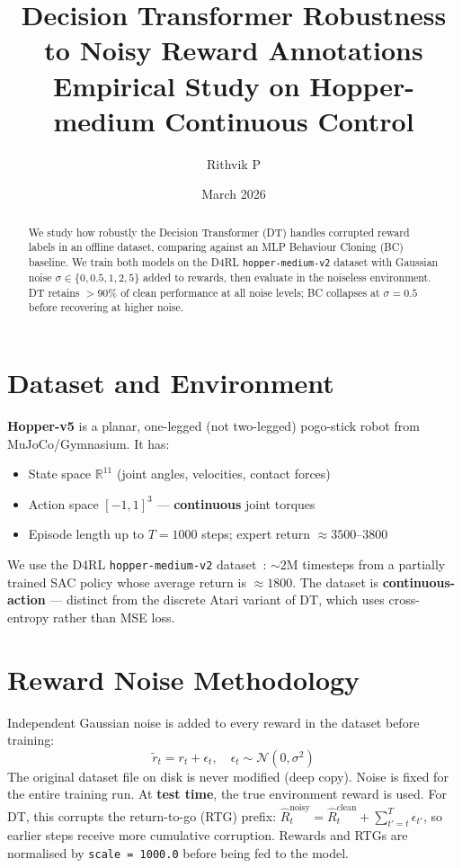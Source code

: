 \documentclass[10pt,a4paper,twocolumn]{article}
\title{\textbf{Decision Transformer Robustness to Noisy Reward Annotations}\\[2pt]
       \normalsize Empirical Study on Hopper-medium Continuous Control}
\author{Rithvik P}
\date{March 2026}
\begin{document}
\maketitle

\begin{abstract}
We study how robustly the Decision Transformer (DT) handles corrupted reward
labels in an offline dataset, comparing against an MLP Behaviour Cloning (BC)
baseline. We train both models on the D4RL \texttt{hopper-medium-v2} dataset with
Gaussian noise $\sigma \in \{0, 0.5, 1, 2, 5\}$ added to rewards, then evaluate
in the noiseless environment. DT retains $>$90\% of clean performance at all noise
levels; BC collapses at $\sigma=0.5$ before recovering at higher noise.
\end{abstract}

\section{Dataset and Environment}

\textbf{Hopper-v5} is a planar, one-legged (not two-legged) pogo-stick robot
from MuJoCo/Gymnasium. It has:
\begin{itemize}[noitemsep,topsep=2pt]
  \item State space $\mathbb{R}^{11}$ (joint angles, velocities, contact forces)
  \item Action space $[-1,1]^3$ — \textbf{continuous} joint torques
  \item Episode length up to $T=1000$ steps; expert return $\approx3500$--$3800$
\end{itemize}

We use the D4RL \texttt{hopper-medium-v2} dataset~\cite{fu2020d4rl}: $\sim$2M
timesteps from a partially trained SAC policy whose average return is $\approx1800$.
The dataset is \textbf{continuous-action} — distinct from the discrete Atari variant
of DT, which uses cross-entropy rather than MSE loss.

\section{Reward Noise Methodology}

Independent Gaussian noise is added to every reward in the dataset before training:
\[
  \tilde{r}_t = r_t + \epsilon_t,\quad \epsilon_t \sim \mathcal{N}(0,\sigma^2)
\]
The original dataset file on disk is never modified (deep copy). Noise is fixed for
the entire training run. At \textbf{test time}, the true environment reward is used.
For DT, this corrupts the return-to-go (RTG) prefix:
$\hat{R}_t^{\text{noisy}} = \hat{R}_t^{\text{clean}} + \sum_{t'=t}^T \epsilon_{t'}$,
so earlier steps receive more cumulative corruption. Rewards and RTGs are normalised
by \texttt{scale = 1000.0} before being fed to the model.
\end{document}
